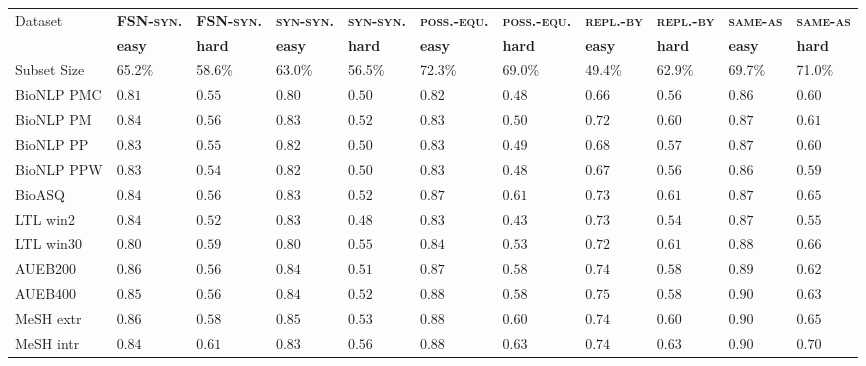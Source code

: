 \documentclass[letterpaper]{article} %
\newcommand{\dataset}[1]{\textsc{#1}}
\begin{document}
\begin{table}[h]
    \centering
\scriptsize	
     \begin{tabular}{l l l l l l l l l l l}
\multirow{2}{*}{Dataset}& \textbf{\dataset{FSN-syn.}} & \textbf{\dataset{FSN-syn.}} & \textbf{\dataset{syn-syn.}} & \textbf{\dataset{syn-syn.}} & \textbf{\dataset{poss.-equ.}} & \textbf{\dataset{poss.-equ.}} & \textbf{\dataset{repl.-by}} & \textbf{\dataset{repl.-by}} & \textbf{\dataset{same-as}} & \textbf{\dataset{same-as}} \\
& \textbf{easy} & \textbf{hard} & \textbf{easy} & \textbf{hard} & \textbf{easy} & \textbf{hard} & \textbf{easy} & \textbf{hard} & \textbf{easy} & \textbf{hard} \\ 
Subset Size & 65.2\% & 58.6\% & 63.0\% & 56.5\% & 72.3\% & 69.0\% & 49.4\% & 62.9\% & 69.7\% & 71.0\% \\
\midrule
BioNLP PMC & $0.81$ & $0.55$ & $0.80$ & $0.50$ & $0.82$ & $0.48$ & $0.66$ & $0.56$ & $0.86$ & $0.60$ \\
BioNLP PM & $0.84$ & $0.56$ & $0.83$ & $0.52$ & $0.83$ & $0.50$ & $0.72$ & $0.60$ & $0.87$ & $0.61$ \\
BioNLP PP & $0.83$ & $0.55$ & $0.82$ & $0.50$ & $0.83$ & $0.49$ & $0.68$ & $0.57$ & $0.87$ & $0.60$ \\
BioNLP PPW & $0.83$ & $0.54$ & $0.82$ & $0.50$ & $0.83$ & $0.48$ & $0.67$ & $0.56$ & $0.86$ & $0.59$ \\
BioASQ & $0.84$ & $0.56$ & $0.83$ & $0.52$ & $0.87$ & $0.61$ & $0.73$ & $0.61$ & $0.87$ & $0.65$ \\
LTL win2 & $0.84$ & $0.52$ & $0.83$ & $0.48$ & $0.83$ & $0.43$ & $0.73$ & $0.54$ & $0.87$ & $0.55$ \\
LTL win30 & $0.80$ & $0.59$ & $0.80$ & $0.55$ & $0.84$ & $0.53$ & $0.72$ & $0.61$ & $0.88$ & $0.66$ \\
AUEB200 & $\mathbf{0.86}$ & $0.56$ & $0.84$ & $0.51$ & $0.87$ & $0.58$ & $0.74$ & $0.58$ & $0.89$ & $0.62$ \\
AUEB400 & $0.85$ & $0.56$ & $0.84$ & $0.52$ & $\mathbf{0.88}$ & $0.58$ & $\mathbf{0.75}$ & $0.58$ & $\mathbf{0.90}$ & $0.63$ \\
MeSH extr & $\mathbf{0.86}$ & $0.58$ & $\mathbf{0.85}$ & $0.53$ & $\mathbf{0.88}$ & $0.60$ & $0.74$ & $0.60$ & $\mathbf{0.90}$ & $0.65$ \\
MeSH intr & $0.84$ & $\mathbf{0.61}$ & $0.83$ & $\mathbf{0.56}$ & $\mathbf{0.88}$ & $\mathbf{0.63}$ & $0.74$ & $\mathbf{0.63}$ & $\mathbf{0.90}$ & $\mathbf{0.70}$ \\

\end{tabular}
\end{table}
\end{document}
